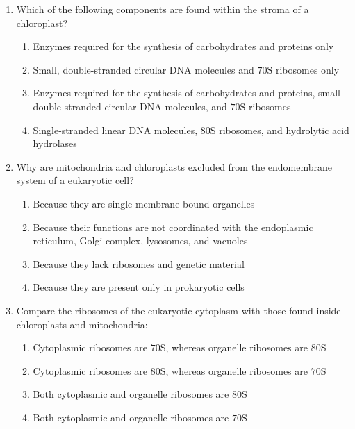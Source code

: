 \documentclass[11pt, a4paper]{article}
\begin{document}
\begin{enumerate}[label=\textbf{\arabic*.}, leftmargin=*, itemsep=8pt]
    \item Which of the following components are found within the stroma of a chloroplast?
    \begin{enumerate}[label=(\alph*)]
        \item Enzymes required for the synthesis of carbohydrates and proteins only
        \item Small, double-stranded circular DNA molecules and $70\text{S}$ ribosomes only
        \item Enzymes required for the synthesis of carbohydrates and proteins, small double-stranded circular DNA molecules, and $70\text{S}$ ribosomes
        \item Single-stranded linear DNA molecules, $80\text{S}$ ribosomes, and hydrolytic acid hydrolases
    \end{enumerate}

    \item Why are mitochondria and chloroplasts excluded from the endomembrane system of a eukaryotic cell?
    \begin{enumerate}[label=(\alph*)]
        \item Because they are single membrane-bound organelles
        \item Because their functions are not coordinated with the endoplasmic reticulum, Golgi complex, lysosomes, and vacuoles
        \item Because they lack ribosomes and genetic material
        \item Because they are present only in prokaryotic cells
    \end{enumerate}

    \item Compare the ribosomes of the eukaryotic cytoplasm with those found inside chloroplasts and mitochondria:
    \begin{enumerate}[label=(\alph*)]
        \item Cytoplasmic ribosomes are $70\text{S}$, whereas organelle ribosomes are $80\text{S}$
        \item Cytoplasmic ribosomes are $80\text{S}$, whereas organelle ribosomes are $70\text{S}$
        \item Both cytoplasmic and organelle ribosomes are $80\text{S}$
        \item Both cytoplasmic and organelle ribosomes are $70\text{S}$
    \end{enumerate}


\end{enumerate}
\end{document}
